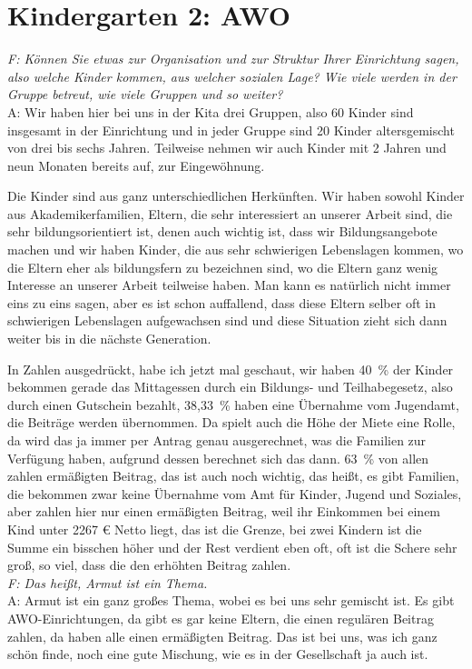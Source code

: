 \section{Kindergarten 2: AWO}
\begin{linenumbers*}
\emph{F:  Können Sie etwas zur Organisation und zur Struktur Ihrer Einrichtung sagen, also welche Kinder kommen, aus welcher sozialen Lage? Wie viele werden in der Gruppe betreut, wie viele Gruppen und so weiter?}\\
A: Wir haben hier bei uns in der Kita drei Gruppen, also 60 Kinder sind insgesamt in der Einrichtung und in jeder Gruppe sind 20 Kinder altersgemischt von drei bis sechs Jahren. Teilweise nehmen wir auch Kinder mit 2 Jahren und neun Monaten bereits auf, zur Eingewöhnung.  

Die Kinder sind aus ganz unterschiedlichen Herkünften. Wir haben sowohl Kinder aus Akademikerfamilien, Eltern, die sehr interessiert an unserer Arbeit sind, die sehr bildungsorientiert ist, denen auch wichtig ist, dass wir Bildungsangebote machen und wir haben Kinder, die aus sehr schwierigen Lebenslagen kommen, wo die Eltern eher als bildungsfern zu bezeichnen sind, wo die Eltern ganz wenig Interesse an unserer Arbeit teilweise haben. Man kann es natürlich nicht immer eins zu eins sagen, aber es ist schon auffallend, dass diese Eltern selber oft in schwierigen Lebenslagen aufgewachsen sind und diese Situation zieht sich dann weiter bis in die nächste Generation.  

In Zahlen ausgedrückt, habe ich jetzt mal geschaut, wir haben 40~\% der Kinder bekommen gerade das Mittagessen durch ein Bildungs- und Teilhabegesetz, also durch einen Gutschein bezahlt, 38,33~\% haben eine Übernahme vom Jugendamt, die Beiträge werden übernommen. Da spielt auch die Höhe der Miete eine Rolle, da wird das ja immer per Antrag genau ausgerechnet, was die Familien zur Verfügung haben, aufgrund dessen berechnet sich das dann. 63~\% von allen zahlen ermäßigten Beitrag, das ist auch noch wichtig, das heißt, es gibt Familien, die bekommen zwar keine Übernahme vom Amt für Kinder, Jugend und Soziales, aber zahlen hier nur einen ermäßigten Beitrag, weil ihr Einkommen bei einem Kind unter 2267 € Netto liegt, das ist die Grenze, bei zwei Kindern ist die Summe ein bisschen höher und der Rest verdient eben oft, oft ist die Schere sehr groß, so viel, dass die den erhöhten Beitrag zahlen.\\
\emph{F: Das heißt, Armut ist ein Thema.}\\
A: Armut ist ein ganz großes Thema, wobei es bei uns sehr gemischt ist. Es gibt AWO-Einrichtungen, da gibt es gar keine Eltern, die einen regulären Beitrag zahlen, da haben alle einen ermäßigten Beitrag. Das ist bei uns, was ich ganz schön finde, noch eine gute Mischung, wie es in der Gesellschaft ja auch ist. 


\end{linenumbers*}
